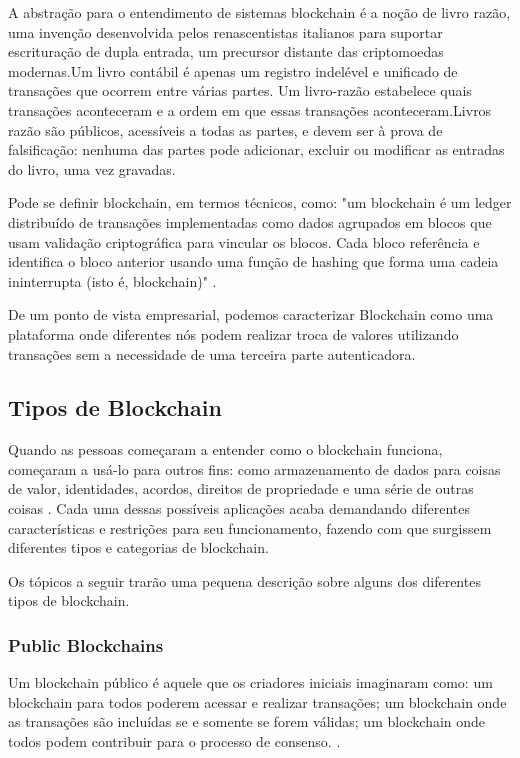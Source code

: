     A abstração para o entendimento de sistemas blockchain é a noção de livro razão, uma invenção desenvolvida pelos renascentistas italianos para suportar escrituração de dupla entrada, um precursor distante das criptomoedas modernas.Um livro contábil é apenas um registro indelével e unificado de transações que ocorrem entre várias partes. Um livro-razão estabelece quais transações aconteceram e a ordem em que essas transações aconteceram.Livros razão são públicos, acessíveis a todas as partes, e devem ser à prova de falsificação: nenhuma das partes pode adicionar, excluir ou modificar as entradas do livro, uma vez gravadas.\cite{blockchain_computing_perspective}
    
    Pode se definir blockchain, em termos técnicos, como: "um blockchain é um ledger distribuído de transações implementadas como dados agrupados em blocos que usam validação criptográfica para vincular os blocos. Cada bloco referência e identifica o bloco anterior usando uma função de hashing que forma uma cadeia ininterrupta (isto é, blockchain)" \cite{blockchain_pratical_guide}.
    
    De um ponto de vista empresarial, podemos caracterizar Blockchain como uma plataforma onde diferentes nós podem realizar troca de valores utilizando transações sem a necessidade de uma terceira parte autenticadora.
    
    
    
    \subsection{Tipos de Blockchain}

    Quando as pessoas começaram a entender como o blockchain funciona, começaram a usá-lo para outros fins: como armazenamento de dados para coisas de valor, identidades, acordos, direitos de propriedade e uma série de outras coisas \cite{blockchain_pratical_guide}. Cada uma dessas possíveis aplicações acaba demandando diferentes características e restrições para seu funcionamento, fazendo com que surgissem diferentes tipos e categorias de blockchain.
    
    Os tópicos a seguir trarão uma pequena descrição sobre alguns dos diferentes tipos de blockchain.
    
    
    \subsubsection{Public Blockchains}
    
    Um blockchain público é aquele que os criadores iniciais imaginaram como: um blockchain para todos poderem acessar e realizar transações; um blockchain onde as transações são incluídas se e somente se forem válidas; um blockchain onde todos podem contribuir para o processo de consenso. \cite{blockchain_pratical_guide}.
    

